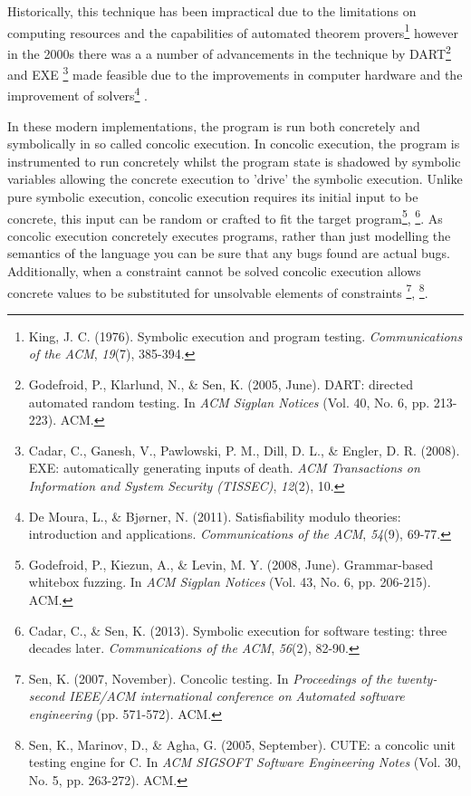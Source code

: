 \documentclass[]{article}
\begin{document}
Historically, this technique has been impractical due to the limitations
on computing resources and the capabilities of automated theorem
provers\footnote{King, J. C. (1976). Symbolic execution and program
  testing. \emph{Communications of the ACM}, \emph{19}(7), 385-394.}
however in the 2000s there was a a number of advancements in the
technique by DART\footnote{Godefroid, P., Klarlund, N., \& Sen, K.
  (2005, June). DART: directed automated random testing. In \emph{ACM
  Sigplan Notices} (Vol. 40, No. 6, pp. 213-223). ACM.} and EXE
\footnote{Cadar, C., Ganesh, V., Pawlowski, P. M., Dill, D. L., \&
  Engler, D. R. (2008). EXE: automatically generating inputs of death.
  \emph{ACM Transactions on Information and System Security (TISSEC)},
  \emph{12}(2), 10.} made feasible due to the improvements in computer
hardware and the improvement of solvers\footnote{De Moura, L., \&
  Bjørner, N. (2011). Satisfiability modulo theories: introduction and
  applications. \emph{Communications of the ACM}, \emph{54}(9), 69-77.}
.

In these modern implementations, the program is run both concretely and
symbolically in so called concolic execution. In concolic execution, the
program is instrumented to run concretely whilst the program state is
shadowed by symbolic variables allowing the concrete execution to
'drive' the symbolic execution. Unlike pure symbolic execution, concolic
execution requires its initial input to be concrete, this input can be
random or crafted to fit the target program\footnote{Godefroid, P.,
  Kiezun, A., \& Levin, M. Y. (2008, June). Grammar-based whitebox
  fuzzing. In \emph{ACM Sigplan Notices} (Vol. 43, No. 6, pp. 206-215).
  ACM.}, \footnote{Cadar, C., \& Sen, K. (2013). Symbolic execution for
  software testing: three decades later. \emph{Communications of the
  ACM}, \emph{56}(2), 82-90.}. As concolic execution concretely executes
programs, rather than just modelling the semantics of the language you
can be sure that any bugs found are actual bugs. Additionally, when a
constraint cannot be solved concolic execution allows concrete values to
be substituted for unsolvable elements of constraints \footnote{Sen, K.
  (2007, November). Concolic testing. In \emph{Proceedings of the
  twenty-second IEEE/ACM international conference on Automated software
  engineering} (pp. 571-572). ACM.}, \footnote{Sen, K., Marinov, D., \&
  Agha, G. (2005, September). CUTE: a concolic unit testing engine for
  C. In \emph{ACM SIGSOFT Software Engineering Notes} (Vol. 30, No. 5,
  pp. 263-272). ACM.}.
\end{document}
